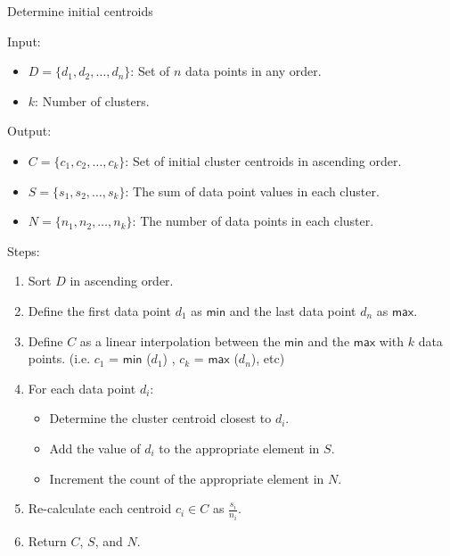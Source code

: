 \documentclass[conference,compsoc]{IEEEtran}
\begin{document}
\begin{algorithm}
    \caption{Determine initial centroids}
    Input:
        \begin{itemize}
            \item $D = \{d_1, d_2, \dots, d_n\}$: Set of $n$ data points in any order.
            \item $k$: Number of clusters.
        \end{itemize}
    Output:
        \begin{itemize}
            \item $C = \{c_1, c_2, \dots, c_k\}$: Set of initial cluster centroids in ascending order.
            \item $S = \{s_1, s_2, \dots, s_k\}$: The sum of data point values in each cluster.
            \item $N = \{n_1, n_2, \dots, n_k\}$: The number of data points in each cluster.
        \end{itemize}
    Steps:
        \begin{enumerate}
            \item Sort $D$ in ascending order.
            \item Define the first data point $d_1$ as $\mathsf{min}$ and the last data point $d_n$ as $\mathsf{max}$.
            \item Define $C$ as a linear interpolation between the $\mathsf{min}$ and the $\mathsf{max}$ with $k$ data points. (i.e. $c_1$ = $\mathsf{min}$ ($d_1$) , $c_k$ = $\mathsf{max}$ ($d_n$), etc)
            \item For each data point $d_i$:
            \begin{itemize}
                \item Determine the cluster centroid closest to $d_i$.
                \item Add the value of $d_i$ to the appropriate element in $S$.
                \item Increment the count of the appropriate element in $N$.
            \end{itemize}
            \item Re-calculate each centroid $c_i \in C$ as $\frac{s_i}{n_i}$.
            \item Return $C$, $S$, and $N$.
        \end{enumerate}
\end{algorithm}

\end{document}
